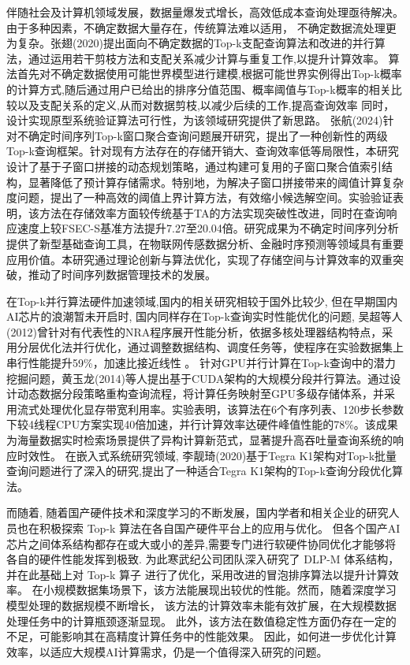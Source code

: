 伴随社会及计算机领域发展，数据量爆发式增长，高效低成本查询处理亟待解决。由于多种因素，不确定数据大量存在，传统算法难以适用，
不确定数据流处理更为复杂。张翅(2020)提出面向不确定数据的Top-k支配查询算法和改进的并行算法\cite{1020759080.nh}，通过运用若干剪枝方法和支配关系减少计算与重复工作,以提升计算效率。
算法首先对不确定数据使用可能世界模型进行建模,根据可能世界实例得出Top-k概率的计算方式,随后通过用户已给出的排序分值范围、概率阈值与Top-k概率的相关比较以及支配关系的定义,从而对数据剪枝,以减少后续的工作,提高查询效率
同时，设计实现原型系统验证算法可行性，为该领域研究提供了新思路。
张航(2024)针对不确定时间序列Top-k窗口聚合查询问题展开研究，提出了一种创新性的两级Top-k查询框架\cite{JSJC20240614003}。针对现有方法存在的存储开销大、查询效率低等局限性，本研究设计了基于子窗口拼接的动态规划策略，通过构建可复用的子窗口聚合值索引结构，显著降低了预计算存储需求。特别地，为解决子窗口拼接带来的阈值计算复杂度问题，提出了一种高效的阈值上界计算方法，有效缩小候选解空间。实验验证表明，该方法在存储效率方面较传统基于TA的方法实现突破性改进，同时在查询响应速度上较FSEC-S基准方法提升7.27至20.04倍。研究成果为不确定时间序列分析提供了新型基础查询工具，在物联网传感数据分析、金融时序预测等领域具有重要应用价值。本研究通过理论创新与算法优化，实现了存储空间与计算效率的双重突破，推动了时间序列数据管理技术的发展。

在Top-k并行算法硬件加速领域,国内的相关研究相较于国外比较少,
但在早期国内AI芯片的浪潮暂未开启时, 国内同样存在Top-k查询实时性能优化的问题,
吴超等人(2012)曾针对有代表性的NRA程序展开性能分析，依据多核处理器结构特点，采用分层优化法并行优化，通过调整数据结构、调度任务等，使程序在实验数据集上串行性能提升59\%，加速比接近线性 \cite{XXWX201207019}。 
针对GPU并行计算在Top-k查询中的潜力挖掘问题，黄玉龙(2014)等人提出基于CUDA架构的大规模分段并行算法。通过设计动态数据分段策略重构查询流程，将计算任务映射至GPU多级存储体系，并采用流式处理优化显存带宽利用率。实验表明，该算法在6个有序列表、120步长参数下较4线程CPU方案实现40倍加速，并行计算效率达硬件峰值性能的78\%。该成果为海量数据实时检索场景提供了异构计算新范式，显著提升高吞吐量查询系统的响应时效性。
在嵌入式系统研究领域, 李靓琦(2020)基于Tegra K1架构对Top-k批量查询问题进行了深入的研究,提出了一种适合Tegra K1架构的Top-k查询分段优化算法\cite{DZRU202017051}。

而随着, 随着国产硬件技术和深度学习的不断发展，国内学者和相关企业的研究人员也在积极探索 Top-k 算法在各自国产硬件平台上的应用与优化。
但各个国产AI芯片之间体系结构都存在或大或小的差异,需要专门进行软硬件协同优化才能够将各自的硬件性能发挥到极致.
为此寒武纪公司团队深入研究了 DLP-M 体系结构，并在此基础上对 Top-k 算子 进行了优化，采用改进的冒泡排序算法以提升计算效率。
在小规模数据集场景下，该方法能展现出较优的性能。然而，随着深度学习模型处理的数据规模不断增长，
该方法的计算效率未能有效扩展，在大规模数据处理任务中的计算瓶颈逐渐显现。
此外，该方法在数值稳定性方面仍存在一定的不足，可能影响其在高精度计算任务中的性能效果。
因此，如何进一步优化计算效率，以适应大规模AI计算需求，仍是一个值得深入研究的问题。


